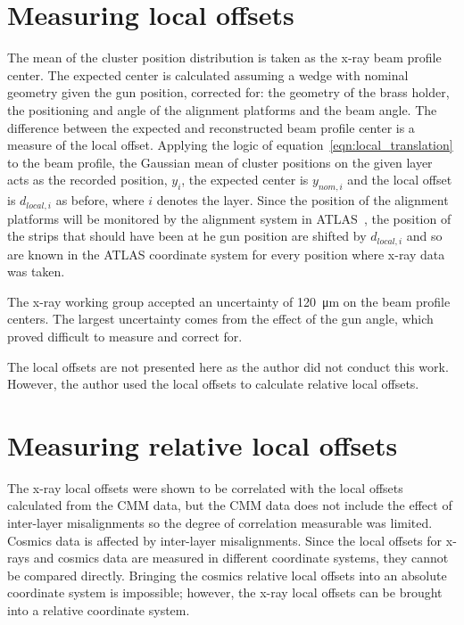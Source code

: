 \section{Measuring local offsets}
The mean of the cluster position distribution is taken as the x-ray beam profile center. The expected center is calculated assuming a wedge with nominal geometry given the gun position, corrected for: the geometry of the brass holder, the positioning and angle of the alignment platforms and the beam angle. The difference between the expected and reconstructed beam profile center is a measure of the local offset. Applying the logic of equation~\ref{eqn:local_translation} to the beam profile, the Gaussian mean of cluster positions on the given layer acts as the recorded position, $y_i$, the expected center is $y_{nom, i}$ and the local offset is $d_{local, i}$ as before, where $i$ denotes the layer. Since the position of the alignment platforms will be monitored by the alignment system in ATLAS~\cite{nsw_tdr}, the position of the strips that should have been at he gun position are shifted by $d_{local, i}$ and so are known in the ATLAS coordinate system for every position where x-ray data was taken.

The x-ray working group accepted an uncertainty of \SI{120}{\micro\meter} on the beam profile centers. The largest uncertainty comes from the effect of the gun angle, which proved difficult to measure and correct for.

The local offsets are not presented here as the author did not conduct this work. However, the author used the local offsets to calculate relative local offsets.

\section{Measuring relative local offsets}

The x-ray local offsets were shown to be correlated with the local offsets calculated from the CMM data, but the CMM data does not include the effect of inter-layer misalignments so the degree of correlation measurable was limited. Cosmics data is affected by inter-layer misalignments. Since the local offsets for x-rays and cosmics data are measured in different coordinate systems, they cannot be compared directly. Bringing the cosmics relative local offsets into an absolute coordinate system is impossible; however, the x-ray local offsets can be brought into a relative coordinate system.

